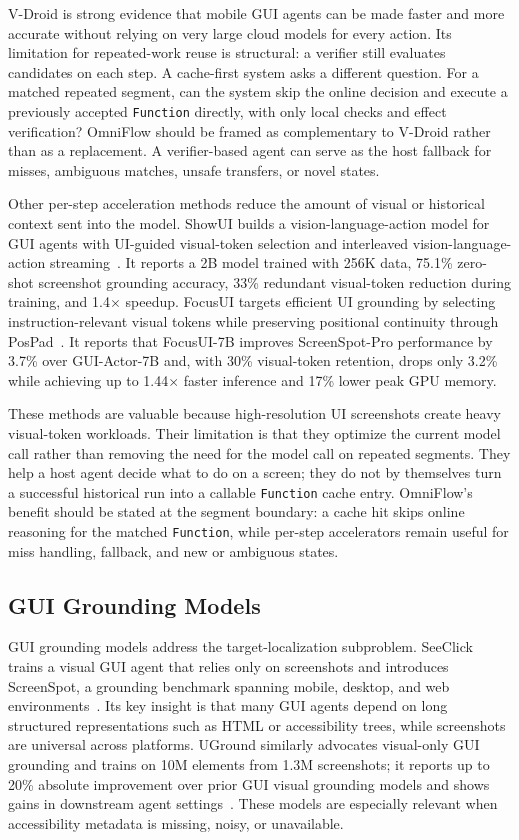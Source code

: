 \documentclass[sigplan,10pt]{acmart}
\newcommand{\sysname}{OmniFlow\xspace}
\begin{document}
V-Droid is strong evidence that mobile GUI agents can be made faster and more
accurate without relying on very large cloud models for every action. Its
limitation for repeated-work reuse is structural: a verifier still evaluates
candidates on each step. A cache-first system asks a different question. For a
matched repeated segment, can the system skip the online decision and execute a
previously accepted \texttt{Function} directly, with only local checks and
effect verification? \sysname should be framed as complementary to V-Droid
rather than as a replacement. A verifier-based agent can serve as the host
fallback for misses, ambiguous matches, unsafe transfers, or novel states.

Other per-step acceleration methods reduce the amount of visual or historical
context sent into the model. ShowUI builds a vision-language-action model for
GUI agents with UI-guided visual-token selection and interleaved
vision-language-action streaming~\cite{lin2025showui}. It reports a 2B model
trained with 256K data, 75.1\% zero-shot screenshot grounding accuracy, 33\%
redundant visual-token reduction during training, and 1.4$\times$ speedup.
FocusUI targets efficient UI grounding by selecting instruction-relevant visual
tokens while preserving positional continuity through
PosPad~\cite{ouyang2026focusui}. It reports that FocusUI-7B improves
ScreenSpot-Pro performance by 3.7\% over GUI-Actor-7B and, with 30\% visual-token
retention, drops only 3.2\% while achieving up to 1.44$\times$ faster inference
and 17\% lower peak GPU memory.

These methods are valuable because high-resolution UI screenshots create heavy
visual-token workloads. Their limitation is that they optimize the current model
call rather than removing the need for the model call on repeated segments. They
help a host agent decide what to do on a screen; they do not by themselves turn
a successful historical run into a callable \texttt{Function} cache entry.
\sysname's benefit should be stated at the segment boundary: a cache hit skips
online reasoning for the matched \texttt{Function}, while per-step accelerators
remain useful for miss handling, fallback, and new or ambiguous states.

\subsection{GUI Grounding Models}

GUI grounding models address the target-localization subproblem. SeeClick
trains a visual GUI agent that relies only on screenshots and introduces
ScreenSpot, a grounding benchmark spanning mobile, desktop, and web
environments~\cite{cheng2024seeclick}. Its key insight is that many GUI agents
depend on long structured representations such as HTML or accessibility trees,
while screenshots are universal across platforms. UGround similarly advocates
visual-only GUI grounding and trains on 10M elements from 1.3M screenshots; it
reports up to 20\% absolute improvement over prior GUI visual grounding models
and shows gains in downstream agent settings~\cite{gou2024uground}. These
models are especially relevant when accessibility metadata is missing, noisy, or
unavailable.
\end{document}
